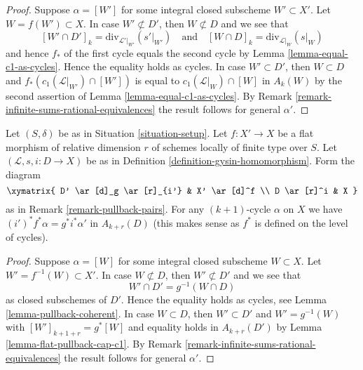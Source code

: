 \begin{proof}
Suppose $\alpha = [W']$ for some integral closed subscheme
$W' \subset X'$. Let $W = f(W') \subset X$. In case $W' \not \subset D'$,
then $W \not \subset D$ and we see that
$$
[W' \cap D']_k = \text{div}_{\mathcal{L}'|_{W'}}({s'|_{W'}})
\quad\text{and}\quad
[W \cap D]_k = \text{div}_{\mathcal{L}|_W}(s|_W)
$$
and hence $f_*$ of the first cycle equals the second cycle by
Lemma \ref{lemma-equal-c1-as-cycles}. Hence the
equality holds as cycles. In case $W' \subset D'$, then
$W \subset D$ and $f_*(c_1(\mathcal{L}|_{W'}) \cap [W'])$
is equal to $c_1(\mathcal{L}|_W) \cap [W]$ in $A_k(W)$ by the second
assertion of Lemma \ref{lemma-equal-c1-as-cycles}.
By Remark \ref{remark-infinite-sums-rational-equivalences}
the result follows for general $\alpha'$.
\end{proof}

\begin{lemma}
\label{lemma-gysin-flat-pullback}
Let $(S, \delta)$ be as in Situation \ref{situation-setup}. Let $f : X' \to X$
be a flat morphism of relative dimension $r$ of schemes locally of finite type
over $S$. Let $(\mathcal{L}, s, i : D \to X)$ be as in
Definition \ref{definition-gysin-homomorphism}. Form the diagram
$$
\xymatrix{
D' \ar[d]_g \ar[r]_{i'} & X' \ar[d]^f \\
D \ar[r]^i & X
}
$$
as in Remark \ref{remark-pullback-pairs}.
For any $(k + 1)$-cycle $\alpha$ on $X$ we have
$(i')^*f^*\alpha = g^*i^*\alpha'$ in $A_{k + r}(D)$
(this makes sense as $f^*$ is defined on the level of cycles).
\end{lemma}

\begin{proof}
Suppose $\alpha = [W]$ for some integral closed subscheme
$W \subset X$. Let $W' = f^{-1}(W) \subset X'$. In case $W \not \subset D$,
then $W' \not \subset D'$ and we see that
$$
W' \cap D' = g^{-1}(W \cap D)
$$
as closed subschemes of $D'$. Hence the
equality holds as cycles, see Lemma \ref{lemma-pullback-coherent}.
In case $W \subset D$, then $W' \subset D'$ and $W' = g^{-1}(W)$
with $[W']_{k + 1 + r} = g^*[W]$ and equality holds in
$A_{k + r}(D')$ by Lemma \ref{lemma-flat-pullback-cap-c1}.
By Remark \ref{remark-infinite-sums-rational-equivalences}
the result follows for general $\alpha'$.
\end{proof}

